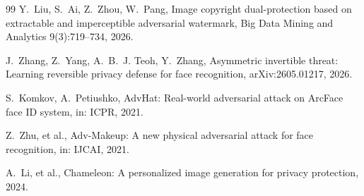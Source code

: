 \documentclass[preprint,12pt]{elsarticle}
\begin{document}
\begin{thebibliography}{99}
 Y.~Liu, S.~Ai, Z.~Zhou, W.~Pang, Image copyright dual-protection based on extractable and imperceptible adversarial watermark, Big Data Mining and Analytics 9(3):719--734, 2026.

 J.~Zhang, Z.~Yang, A.~B.~J. Teoh, Y.~Zhang, Asymmetric invertible threat: Learning reversible privacy defense for face recognition, arXiv:2605.01217, 2026.

 S.~Komkov, A.~Petiushko, AdvHat: Real-world adversarial attack on ArcFace face ID system, in: ICPR, 2021.

 Z.~Zhu, et al., Adv-Makeup: A new physical adversarial attack for face recognition, in: IJCAI, 2021.

 A.~Li, et al., Chameleon: A personalized image generation for privacy protection, 2024.

\end{thebibliography}
\end{document}
